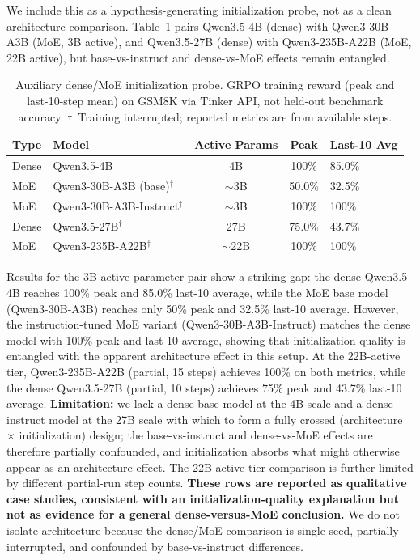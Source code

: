 \documentclass{article}
\begin{document}
We include this as a hypothesis-generating initialization probe, not as a
clean architecture comparison. Table~\ref{tab:dense_moe} pairs Qwen3.5-4B
(dense) with Qwen3-30B-A3B (MoE, 3B active), and Qwen3.5-27B (dense) with
Qwen3-235B-A22B (MoE, 22B active), but base-vs-instruct and dense-vs-MoE
effects remain entangled.

\begin{table}[htbp]
\centering
\caption{Auxiliary dense/MoE initialization probe. GRPO training reward (peak and last-10-step mean) on GSM8K via Tinker API, not held-out benchmark accuracy. $\dagger$~Training interrupted; reported metrics are from available steps.}
\label{tab:dense_moe}
\begin{tabular}{llccp{4.2cm}}
\toprule
\textbf{Type} & \textbf{Model} & \textbf{Active Params} & \textbf{Peak} & \textbf{Last-10 Avg} \\
\midrule
Dense & Qwen3.5-4B & 4B & 100\% & 85.0\% \\
MoE & Qwen3-30B-A3B (base)$^\dagger$ & $\sim$3B & 50.0\% & 32.5\% \\
MoE & Qwen3-30B-A3B-Instruct$^\dagger$ & $\sim$3B & 100\% & 100\% \\
\midrule
Dense & Qwen3.5-27B$^\dagger$ & 27B & 75.0\% & 43.7\% \\
MoE & Qwen3-235B-A22B$^\dagger$ & $\sim$22B & 100\% & 100\% \\
\bottomrule
\end{tabular}
\end{table}

Results for the 3B-active-parameter pair show a striking gap: the dense
Qwen3.5-4B reaches 100\% peak and 85.0\% last-10 average, while the
MoE base model (Qwen3-30B-A3B) reaches only 50\% peak and 32.5\% last-10
average. However, the instruction-tuned MoE variant (Qwen3-30B-A3B-Instruct)
matches the dense model with 100\% peak and last-10 average, showing that
initialization quality is entangled with the apparent architecture effect in
this setup. At the 22B-active tier, Qwen3-235B-A22B
(partial, 15 steps) achieves 100\% on both metrics, while the dense
Qwen3.5-27B (partial, 10 steps) achieves 75\% peak and 43.7\% last-10
average.  \textbf{Limitation:} we lack a dense-base model at the 4B scale
and a dense-instruct model at the 27B scale with which to form a fully
crossed (architecture $\times$ initialization) design; the base-vs-instruct
and dense-vs-MoE effects are therefore partially confounded, and initialization absorbs
what might otherwise appear as an architecture effect.  The 22B-active tier
comparison is further limited by different partial-run step counts.
\textbf{These rows are reported as qualitative case studies, consistent with an
initialization-quality explanation but not as evidence for a general
dense-versus-MoE conclusion.}  We do not isolate architecture because the
dense/MoE comparison is single-seed, partially interrupted, and confounded
by base-vs-instruct differences.
\end{document}
